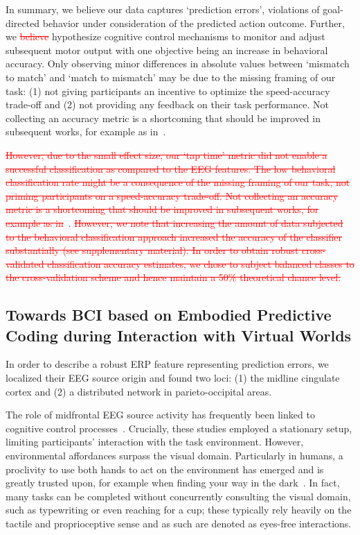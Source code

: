 In summary, we believe our data captures `prediction errors', violations of goal-directed behavior under consideration of the predicted action outcome. Further, we \textcolor{red}{\st{believe}} \textcolor{n}{hypothesize} cognitive control mechanisms to monitor and adjust subsequent motor output with one objective being an increase in behavioral accuracy. \textcolor{n}{Only observing minor differences in absolute values between `mismatch to match' and `match to mismatch' may be due to the missing framing of our task: (1) not giving participants an incentive to optimize the speed-accuracy trade-off and (2) not providing any feedback on their task performance. Not collecting an accuracy metric is a shortcoming that should be improved in subsequent works, for example as in}~\cite{Purcell2016-li}.

\textcolor{red}{\st{However, due to the small effect size, our `tap time' metric did not enable a successful classification as compared to the EEG features. The low behavioral classification rate might be a consequence of the missing framing of our task, not priming participants on a speed-accuracy trade-off. Not collecting an accuracy metric is a shortcoming that should be improved in subsequent works, for example as in}~\cite{Purcell2016-li}.\st{ However, we note that increasing the amount of data subjected to the behavioral classification approach increased the accuracy of the classifier substantially (see supplementary material). In order to obtain robust cross-validated classification accuracy estimates, we chose to subject balanced classes to the cross-validation scheme and hence maintain a 50\% theoretical chance level.}}

\subsection{\textcolor{n}{Towards} BCI based on Embodied Predictive Coding during Interaction with Virtual Worlds}

In order to describe a robust ERP feature representing prediction errors, we localized their EEG source origin and found two loci: (1) the midline cingulate cortex and (2) a distributed network in parieto-occipital areas. 

The role of midfrontal EEG source activity has frequently been linked to cognitive control processes~\cite{Ridderinkhof2004-rz, Cavanagh2014-mm, Cooper2019-im}. Crucially, these studies employed a stationary setup, limiting participants' interaction with the task environment. However, environmental affordances surpass the visual domain. Particularly in humans, a proclivity to use both hands to act on the environment has emerged and is greatly trusted upon, for example when finding your way in the dark~\cite{Gehrke2018-jm, Gehrke2021-ml, Miyakoshi2021-ni}. In fact, many tasks can be completed without concurrently consulting the visual domain, such as typewriting or even reaching for a cup; these typically rely heavily on the tactile and proprioceptive sense and as such are denoted as eyes-free interactions.


